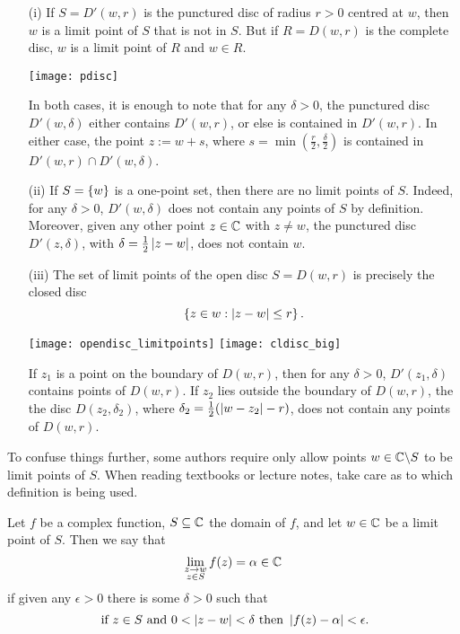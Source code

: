 \begin{example}
\begin{enumerate}
\item[(i)]  If $S=D'(w,r)$ is the punctured disc of radius $r>0$ centred at $w$, then $w$ is a limit point of $S$ that is not in $S$.
But if $R=D(w,r)$ is the complete disc, $w$ is a limit point of $R$ and $w \in R$.
\begin{center}
\texttt{[image: pdisc]}
\end{center}
In both cases, it is enough to note that for any $\delta>0$, the punctured disc $D'(w,\delta)$ either contains $D'(w,r)$, or else is contained in $D'(w,r)$.  In either case, the point $z:=w+s$, where $s=\min ( \frac{r}{2},\frac{\delta}{2})$ is contained in $D'(w,r) \cap D'(w, \delta)$.

\item[(ii)] If $S= \left\{w\right\}$ is a one-point set, then there are no limit points of $S$.  Indeed, for any $\delta>0$, $D'(w,\delta)$ does not contain any points of $S$ by definition.  Moreover, given any other point $z\in \mathbb{C}$ with $z \neq w$, the punctured disc $D'(z,\delta)$, with $\delta = \frac{1}{2} \left| z-w \right|$, does not contain $w$.

\item[(iii)] The set of limit points of the open disc $S=D(w,r)$ is precisely the closed disc
\[
\left\{z \in w: \left| z-w \right| \leq r \right\}.
\]
\begin{center}
\texttt{[image: opendisc\_limitpoints]} \qquad
\texttt{[image: cldisc\_big]}
\end{center}

If $z_1$ is a point on the boundary of $D(w,r)$, then for any $\delta>0$, $D'(z_1,\delta)$ contains points of $D(w,r)$.  If $z_2$ lies outside the boundary of $D(w,r)$, the the disc $D(z_2,\delta_2)$, where $\delta_2 = \frac{1}{2} ( \left| w-z_2 \right| -r)$, does not contain any points of $D(w,r)$.

\end{enumerate}
\end{example}


\begin{note}
To confuse things further, some authors require only allow points $w \in \mathbb{C} \backslash S$ to be limit points of $S$.  When reading textbooks or lecture notes, take care as to which definition is being used.
\end{note}


\begin{definition}
\label{d:limit}
Let $f$ be a complex function, $S \subseteq \mathbb{C}$ the domain of $f$,  and let $w \in \mathbb{C}$ be a limit point of $S$. Then we say that \[ \lim_{\substack{z \to w \\ z \in S}} f(z) = \alpha \in \mathbb{C}\] if given any $\epsilon >0$ there is some $\delta >0$ such that
\[ \text{ if $z \in S$ and } 0<\left| z-w \right| < \delta \text{ then }\left| f(z)-\alpha \right|< \epsilon.\]
\end{definition}
 
